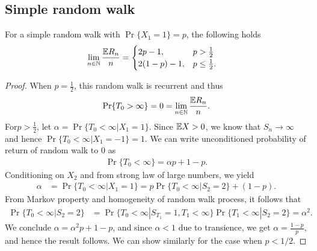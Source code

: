 \documentclass[a4paper,10pt,english]{article}
\begin{document}
\subsection{Simple random walk}
\begin{thm}[range]
For a simple random walk with $\Pr\{X_1 = 1\} = p$, the following holds
\begin{align*}
\lim_{n \in \mathbb{N}}\frac{\mathbb{E} R_n }{n} &= 
	\begin{cases}
2p - 1, & p > \frac{1}{2}\\
2(1-p)-1, & p \leq \frac{1}{2}.
	\end{cases}
\end{align*}
\end{thm}
\begin{proof}
When $p=\frac{1}{2}$, this random walk is recurrent and thus
\begin{align*}
\Pr\{T_0 > \infty\} = 0 = \lim_{n \in \mathbb{N}} \frac{\mathbb{E} R_n}{n}.
\end{align*}
For$p > \frac{1}{2}$, let $\alpha = \Pr\{ T_0 < \infty |X_1 = 1\}$. 
Since $\mathbb{E} X > 0$, we know that $S_n \to \infty$ and hence $\Pr\{T_0  < \infty |X_1 = -1\} = 1$. 
We can write unconditioned probability of return of random walk to $0$ as 
\begin{align*}
\Pr\{T_0 < \infty\} = \alpha p+ 1-p.
\end{align*}
Conditioning on $X_2$ and from strong law of large numbers, we yield
\begin{align*}
\alpha &= \Pr\{T_0 < \infty |X_1 = 1\} = p\Pr\{T_0 < \infty | S_2  = 2\}  + (1-p).
\end{align*}
From Markov property and homogeneity of random walk process, it follows that 
\begin{align*}
\Pr\{T_0 < \infty | S_2  = 2\} &= \Pr\{T_0 < \infty | S_{T_1} = 1, T_1 < \infty \}\Pr\{T_1 < \infty | S_2 = 2\} = \alpha^2.
\end{align*}
We conclude $\alpha = \alpha^2 p + 1-p$, and since $\alpha < 1$ due to transience, we get $\alpha = \frac{1-p}{p}$, and hence the result follows. We can show similarly for the case when $p < 1/2$.
\end{proof}
\end{document}
